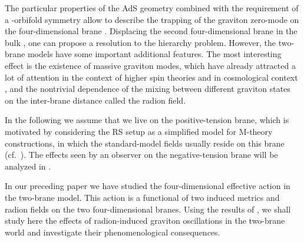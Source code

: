 \documentclass[a4paper,prl,twocolumn,amsmath,amssymb,showpacs]{revtex4}
\begin{document}
The particular properties of the AdS geometry combined with the requirement of 
a \coordHE{}-orbifold symmetry allow to describe the trapping of the 
graviton zero-mode 
on the four-dimensional brane \cite{RS2}. 
Displacing the second four-dimensional brane in the bulk \cite{RS1}, one can 
propose a resolution to the hierarchy problem.  However, the two-brane models 
have some important additional features.   
The most interesting effect is the existence of massive graviton modes, 
which have already attracted a lot of attention in the context of higher 
spin theories and in cosmological context \cite{Vas,Deser},  
and the nontrivial dependence of 
the mixing between different graviton states on the inter-brane distance 
called the radion field.  
 
In the following we assume that we live on the positive-tension 
brane, which is motivated by considering the RS setup as a simplified model 
for M-theory constructions, in which the standard-model fields usually reside 
on this brane (cf.\ \cite{Pyr}). The effects seen by an observer on the 
negative-tension brane will be analyzed in \cite{tocome}. 
 
In our preceding 
paper \cite{we} we have studied the four-dimensional effective action in the 
two-brane model.  This action is a functional of two induced metrics 
and radion fields on the two four-dimensional 
branes.  Using the results of \cite{we}, we shall study here 
the effects of radion-induced graviton oscillations  
in the two-brane world and investigate their phenomenological consequences. 
  
\end{document}
